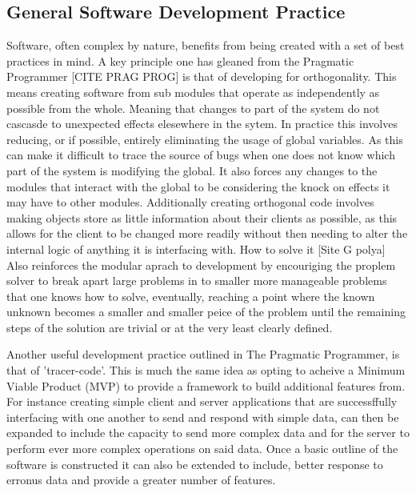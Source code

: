   \subsection{General Software Development Practice}
    Software, often complex by nature, benefits from being created with a set of best practices in mind. A key principle one has gleaned from the Pragmatic Programmer [CITE PRAG PROG] is that of developing for orthogonality. This means creating software from sub modules that operate as independently as possible from the whole. Meaning that changes to part of the system do not cascasde to unexpected effects elesewhere in the sytem. In practice this involves reducing, or if possible, entirely eliminating the usage of global variables. As this can make it difficult to trace the source of bugs when one does not know which part of the system is modifying the global. It also forces any changes to the modules that interact with the global to be considering the knock on effects it may have to other modules. Additionally creating orthogonal code involves making objects store as little information about their clients as possible, as this allows for the client to be changed more readily without then needing to alter the internal logic of anything it is interfacing with. How to solve it [Site G polya] Also reinforces the modular aprach to development by encouriging the proplem solver to break apart large problems in to smaller more manageable problems that one knows how to solve, eventually, reaching a point where the known unknown becomes a smaller and smaller peice of the problem until the remaining steps of the solution are trivial or at the very least clearly defined.
    \par
    Another useful development practice outlined in The Pragmatic Programmer, is that of 'tracer-code'. This is much the same idea as opting to acheive a Minimum Viable Product (MVP) to provide a framework to build additional features from. For instance creating simple client and server applications that are successffully interfacing with one another to send and respond with simple data, can then be expanded to include the capacity to send more complex data and for the server to perform ever more complex operations on said data. Once a basic outline of the software is constructed it can also be extended to include, better response to erronus data and provide a greater number of features.
    \par
